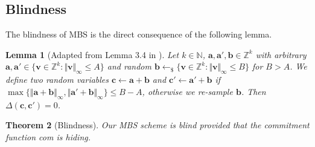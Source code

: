 \documentclass[conference]{IEEEtran}
\newtheorem{theorem}{Theorem}[section]
\newtheorem{lemma}[theorem]{Lemma}
\begin{document}
	\subsection{Blindness}
	
	The blindness of \textsf{MBS} is the direct consequence of the following lemma. 
	
	\begin{lemma} [Adapted from Lemma 3.4 in \cite{Ruc08}] \label{blind}
		Let $k\in \mathbb{N}$, $\mathbf{a},\mathbf{a}', \mathbf{b} \in \mathbb{Z}^k$ with arbitrary $\mathbf{a}, \mathbf{a}' \in \{  \mathbf{v} \in \mathbb{Z}^k: \Vert  \mathbf{v}\Vert_{\infty}\leq A\}$ and random $\mathbf{b} \leftarrow_{\$} \{  \mathbf{v} \in \mathbb{Z}^k: \Vert  \mathbf{v}\Vert_{\infty}\leq B\}$ for $B>A$. We define two random variables $\mathbf{c} \leftarrow \mathbf{a}+ \mathbf{b} $ and $\mathbf{c}'\leftarrow \mathbf{a}'+\mathbf{b} $ if $\max\{ \Vert \mathbf{a}+\mathbf{b} \Vert_{\infty} , \Vert \mathbf{a}'+\mathbf{b} \Vert_{\infty}\} \leq B-A$, otherwise we re-sample $\mathbf{b}$. Then $\Delta(\mathbf{c}, \mathbf{c}')=0$.
	\end{lemma}
	
	
	
	\begin{theorem}[Blindness] \label{blindness} 
		Our \textsf{MBS} scheme is blind provided that the commitment function \textsf{com} is hiding.
	\end{theorem}
	
\end{document}
